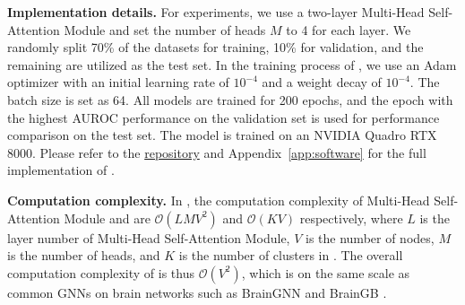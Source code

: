 \textbf{Implementation details.} For experiments, we use a two-layer Multi-Head Self-Attention Module and set the number of heads $M$ to 4 for each layer. We randomly split 70\% of the datasets for training, 10\% for validation, and the remaining are utilized as the test set. In the training process of \methodtable, we use an Adam optimizer with an initial learning rate of $10^{-4}$ and a weight decay of $10^{-4}$. The batch size is set as 64. All models are trained for 200 epochs, and the epoch with the highest AUROC performance on the validation set is used for performance comparison on the test set. The model is trained on an NVIDIA Quadro RTX 8000. Please refer to the \href{https://github.com/Wayfear/BrainNetworkTransformer}{repository} and Appendix~\ref{app:software} for the full implementation of \methodtable. 

\textbf{Computation complexity.} In \methodtable, the computation complexity of Multi-Head Self-Attention Module and \poolingshort are $\mathcal{O}(LMV^2)$ and $\mathcal{O}(KV)$ respectively, where $L$ is the layer number of Multi-Head Self-Attention Module, $V$ is the number of nodes, $M$ is the number of heads, and $K$ is the number of clusters in \poolingshort. The overall computation complexity of \methodtable is thus $\mathcal{O}(V^2)$, which is on the same scale as common GNNs on brain networks such as BrainGNN \citep{li2020braingnn} and BrainGB \citep{braingb}. 

